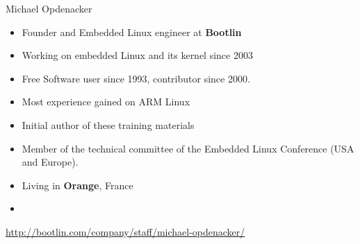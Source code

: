 \begin{frame}{Michael Opdenacker}
    \begin{itemize}
	\item Founder and Embedded Linux engineer at {\bf Bootlin}
	\item Working on embedded Linux and its kernel since 2003
	\item Free Software user since 1993, contributor since 2000.
	\item Most experience gained on ARM Linux
	\item Initial author of these training materials
	\item Member of the technical committee of the Embedded Linux
	      Conference (USA and Europe).
	\item Living in {\bf Orange}, France
	\item {}
    \end{itemize}
    {\small \url{http://bootlin.com/company/staff/michael-opdenacker/}}
\end{frame}
